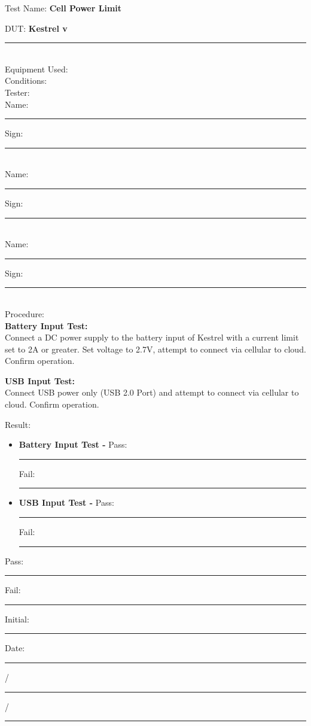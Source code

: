 \pagebreak
{\Huge Test Name: \textbf{Cell Power Limit}}\\[20pt]
{\Large DUT: \textbf{Kestrel v}\rule{1cm}{0.15mm}} \\[10pt]
{\Large Equipment Used: }\\[40pt]
{\Large Conditions: }\\[40pt]
{\Large Tester: }\\[10pt]
Name: \rule{4cm}{0.15mm} \hfill Sign: \rule{4cm}{0.15mm}\\[5pt]
Name: \rule{4cm}{0.15mm} \hfill Sign: \rule{4cm}{0.15mm}\\[5pt]
Name: \rule{4cm}{0.15mm} \hfill Sign: \rule{4cm}{0.15mm}\\[15pt]
{\Large Procedure: }\\
\textbf{Battery Input Test:}\\
Connect a DC power supply to the battery input of Kestrel with a current limit set to 2A or greater. Set voltage to 2.7V, attempt to connect via cellular to cloud. Confirm operation.

\textbf{USB Input Test:}\\
Connect USB power only (USB 2.0 Port) and attempt to connect via cellular to cloud. Confirm operation. 

{\Large Result:}\\

\begin{itemize}
\item \textbf{Battery Input Test - } \hfill Pass: \rule{1cm}{0.15mm} \hspace{1cm} Fail: \rule{1cm}{0.15mm}
\item \textbf{USB Input Test - } \hfill Pass: \rule{1cm}{0.15mm} \hspace{1cm} Fail: \rule{1cm}{0.15mm}
\end{itemize}

\vfill
{\large Pass: \rule{1cm}{0.15mm} \hspace{1cm} Fail: \rule{1cm}{0.15mm}} \hfill Initial: \rule{2cm}{0.15mm} \hspace{1cm} Date: \rule{0.5cm}{0.15mm}/\rule{0.5cm}{0.15mm}/\rule{1cm}{0.15mm}\\[5pt]

